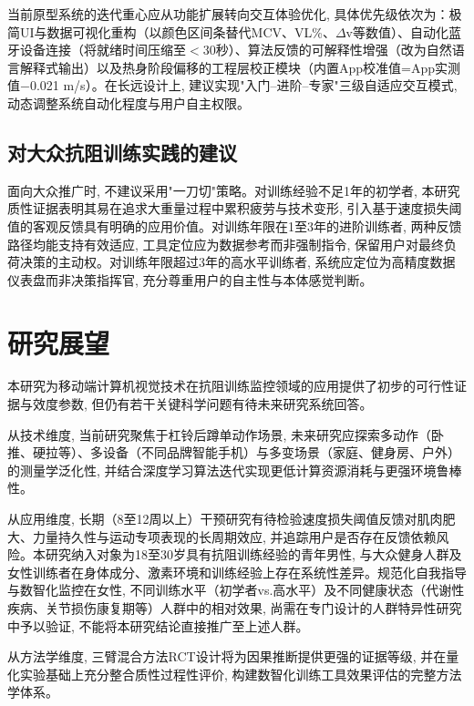 当前原型系统的迭代重心应从功能扩展转向交互体验优化, 具体优先级依次为：极简UI与数据可视化重构（以颜色区间条替代MCV、VL\%、$\Delta$v等数值）、自动化蓝牙设备连接（将就绪时间压缩至$<$30秒）、算法反馈的可解释性增强（改为自然语言解释式输出）以及热身阶段偏移的工程层校正模块（内置App校准值=App实测值$-$0.021 m/s）。在长远设计上, 建议实现"入门--进阶--专家"三级自适应交互模式, 动态调整系统自动化程度与用户自主权限。

\subsection{对大众抗阻训练实践的建议}
\label{sec:practice_recommendation}

面向大众推广时, 不建议采用"一刀切"策略。对训练经验不足1年的初学者, 本研究质性证据表明其易在追求大重量过程中累积疲劳与技术变形, 引入基于速度损失阈值的客观反馈具有明确的应用价值。对训练年限在1至3年的进阶训练者, 两种反馈路径均能支持有效适应, 工具定位应为数据参考而非强制指令, 保留用户对最终负荷决策的主动权。对训练年限超过3年的高水平训练者, 系统应定位为高精度数据仪表盘而非决策指挥官, 充分尊重用户的自主性与本体感觉判断。

\section{研究展望}
\label{sec:future_directions}

本研究为移动端计算机视觉技术在抗阻训练监控领域的应用提供了初步的可行性证据与效度参数, 但仍有若干关键科学问题有待未来研究系统回答。

从技术维度, 当前研究聚焦于杠铃后蹲单动作场景, 未来研究应探索多动作（卧推、硬拉等）、多设备（不同品牌智能手机）与多变场景（家庭、健身房、户外）的测量学泛化性, 并结合深度学习算法迭代实现更低计算资源消耗与更强环境鲁棒性。

从应用维度, 长期（8至12周以上）干预研究有待检验速度损失阈值反馈对肌肉肥大、力量持久性与运动专项表现的长周期效应, 并追踪用户是否存在反馈依赖风险。本研究纳入对象为18至30岁具有抗阻训练经验的青年男性, 与大众健身人群及女性训练者在身体成分、激素环境和训练经验上存在系统性差异。规范化自我指导与数智化监控在女性, 不同训练水平（初学者vs.高水平）及不同健康状态（代谢性疾病、关节损伤康复期等）人群中的相对效果, 尚需在专门设计的人群特异性研究中予以验证, 不能将本研究结论直接推广至上述人群。

从方法学维度, 三臂混合方法RCT设计将为因果推断提供更强的证据等级, 并在量化实验基础上充分整合质性过程性评价, 构建数智化训练工具效果评估的完整方法学体系。
